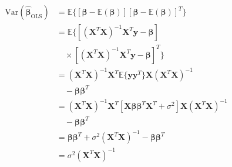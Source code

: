\documentclass[%
reprint,
amsmath,amssymb,
aps,
]{revtex4-2}
\begin{document}
\begin{align*}
	\text{Var}(\hat{\bm\beta}_\text{OLS})&=\mathbb E\{ [\bm\beta-\mathbb E(\bm\beta)] [\bm\beta-\mathbb E(\bm\beta)]^T\}\\
	&=\mathbb E\{ [(\bm X^T\bm X)^{-1}\bm X^T\bm y-\bm\beta]\\
	&\quad\times[(\bm X^T\bm X)^{-1}\bm X^T\bm y-\bm\beta]^T\}\\
	&=(\bm X^T\bm X)^{-1}\bm X^T\mathbb E\{\bm y\bm y^T\}\bm X(\bm X^T\bm X)^{-1}\\
	&\quad-\bm\beta\bm\beta^T\\
	&=(\bm X^T\bm X)^{-1}\bm X^T[\bm X\bm\beta\bm\beta^T\bm X^T+\sigma^2]\bm X(\bm X^T\bm X)^{-1}\\
	&\quad-\bm\beta\bm\beta^T\\
	&=\bm\beta\bm\beta^T+\sigma^2(\bm X^T\bm X)^{-1}-\bm\beta\bm\beta^T\\
	&=\sigma^2(\bm X^T \bm X)^{-1}
\end{align*}
\end{document}
